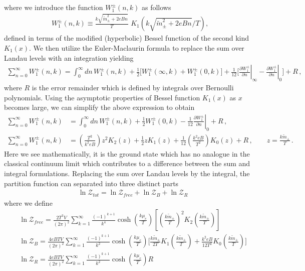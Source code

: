 \documentclass[Universe,article,submit,moreauthors,pdftex]{Definitions/mdpi}
\begin{document}
where we introduce the function $W^\pm_1(n,k)$ as follows
\begin{align}
W^\pm_1(n,k)\equiv\frac{k\sqrt{\tilde{m}^2_\pm+2eBn}}{T}\,\,K_1\!\!\left({k\sqrt{\tilde{m}^2_\pm+2eBn}}/{T}\right),
\end{align}
defined in terms of the modified (hyperbolic) Bessel function of the second kind $K_{1}(x)$. We then utilize the Euler-Maclaurin formula to replace the sum over Landau levels with an integration yielding
\begin{align}
\sum^{\infty}_{n=0}W^\pm_1(n,k)=\int^\infty_0\!\!dn\,W^\pm_1(n,k)+\frac{1}{2}\bigg[W^\pm_1(\infty,k)+W^\pm_1(0,k)\bigg]+\frac{1}{12}\bigg[\left.\frac{\partial W^\pm_1}{\partial n}\right|_{\infty}-\left.\frac{\partial W^\pm_1}{\partial n}\right|_{0}\bigg]+R\,,
\end{align}
where $R$ is the error remainder which is defined by integrals over Bernoulli polynomials. Using the asymptotic properties of Bessel function $K_{1}(x)$ as $x$ becomes large, we can simplify the above expression to obtain
\begin{align}
\label{Winitial}\sum^{\infty}_{n=0}W^\pm_1(n,k)&=\int^\infty_0\!\!dn\,W^\pm_1(n,k)+\frac{1}{2}W^\pm_1(0,k)-\frac{1}{12}\left.\frac{\partial W^\pm_1}{\partial n}\right|_{0}+R\,,\\
\label{WReplacement}\sum^{\infty}_{n=0}W^\pm_1(n,k)&=\left(\frac{T^2}{k^2eB}\right)z^{2}K_{2}(z)+\frac{1}{2}zK_{1}(z)+\frac{1}{12}\left(\frac{k^2eB}{T^2}\right)K_{0}(z)+R\,,\qquad z = \frac{k\tilde{m}_{\pm}}{T}\,.
\end{align}
Here we see mathematically, it is the ground state which has no analogue in the classical continuum limit which contributes to a difference between the sum and integral formulations. Replacing the sum over Landau levels by the integral, the partition function can separated into three distinct parts
\begin{align}
&\ln\mathcal{Z}_{tot}=\ln\mathcal{Z}_{free}+\ln\mathcal{Z}_B+\ln\mathcal{Z}_R
\end{align}
where we define 
\begin{align}
&\ln\mathcal{Z}_{free}=\frac{2T^3V}{(2\pi)^2}\sum^{\infty}_{k=1}\frac{(-1)^{k+1}}{k^4}\cosh{\left(\frac{k\mu_{e}}{T}\right)}\left[\left(\frac{k\tilde{m}_\pm}{T}\right)^2K_2\left(\frac{k\tilde{m}_\pm}{T}\right)\right]\\
&\ln\mathcal{Z}_B=\frac{4eBTV}{(2\pi)^2}\sum^{\infty}_{k=1}\frac{(-1)^{k+1}}{k^2}\cosh{\left(\frac{k\mu_{e}}{T}\right)}\bigg[\frac{k\tilde{m}_\pm}{2T}K_1\left(\frac{k\tilde m_\pm}{T}\right)+\frac{k^2eB}{12T^2}K_0\left(\frac{k\tilde m_\pm}{T}\right)\bigg]\\
&\ln\mathcal{Z}_R=\frac{4eBTV}{(2\pi)^2}\sum^{\infty}_{k=1}\frac{(-1)^{k+1}}{k^2}\cosh{\left(\frac{k\mu_e}{T}\right)}R
\end{align}
\end{document}
